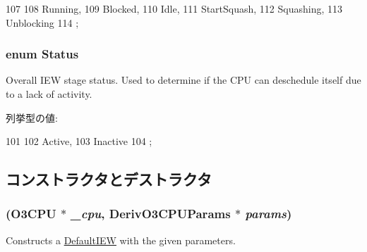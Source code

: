 \begin{DoxyCode}
107                      {
108         Running,
109         Blocked,
110         Idle,
111         StartSquash,
112         Squashing,
113         Unblocking
114     };
\end{DoxyCode}
\hypertarget{classDefaultIEW_a67a0db04d321a74b7e7fcfd3f1a3f70b}{
\subsubsection[{Status}]{\setlength{\rightskip}{0pt plus 5cm}enum {\bf Status}}}
\label{classDefaultIEW_a67a0db04d321a74b7e7fcfd3f1a3f70b}
Overall IEW stage status. Used to determine if the CPU can deschedule itself due to a lack of activity. \begin{Desc}
\item[列挙型の値: ]\par
\begin{description}
\item[{\em 
\hypertarget{classDefaultIEW_a67a0db04d321a74b7e7fcfd3f1a3f70ba26bd8444261cc58df7a86753c79d2520}{
Active}
\label{classDefaultIEW_a67a0db04d321a74b7e7fcfd3f1a3f70ba26bd8444261cc58df7a86753c79d2520}
}]\item[{\em 
\hypertarget{classDefaultIEW_a67a0db04d321a74b7e7fcfd3f1a3f70ba969c924a722daf6334fca64346092ae6}{
Inactive}
\label{classDefaultIEW_a67a0db04d321a74b7e7fcfd3f1a3f70ba969c924a722daf6334fca64346092ae6}
}]\end{description}
\end{Desc}




\begin{DoxyCode}
101                 {
102         Active,
103         Inactive
104     };
\end{DoxyCode}


\subsection{コンストラクタとデストラクタ}
\hypertarget{classDefaultIEW_a2440a84872425a3bfdbd6dfd37760345}{
\subsubsection[{DefaultIEW}]{ ({\bf O3CPU} $\ast$ {\em \_\-cpu}, \/  DerivO3CPUParams $\ast$ {\em params})}}
\label{classDefaultIEW_a2440a84872425a3bfdbd6dfd37760345}
Constructs a \hyperlink{classDefaultIEW}{DefaultIEW} with the given parameters. 


